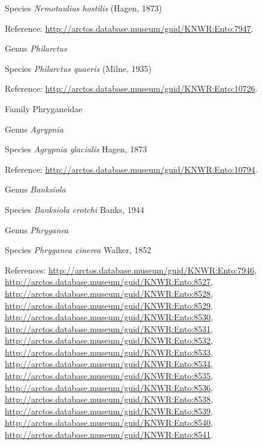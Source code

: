 \documentclass[9pt, article]{memoir}
\begin{document}
\begin{multicols}{2}
\vspace{6pt}\noindent\hspace{36pt}Species \textit{Nemotaulius hostilis} (Hagen, 1873)


Reference: 
\url{http://arctos.database.museum/guid/KNWR:Ento:7947}.

\vspace{6pt}\noindent\hspace{30pt}Genus \textit{Philarctus}


\vspace{6pt}\noindent\hspace{36pt}Species \textit{Philarctus quaeris} (Milne, 1935)


Reference: 
\url{http://arctos.database.museum/guid/KNWR:Ento:10726}.

\vspace{6pt}\noindent\hspace{24pt}Family Phryganeidae


\vspace{6pt}\noindent\hspace{30pt}Genus \textit{Agrypnia}


\vspace{6pt}\noindent\hspace{36pt}Species \textit{Agrypnia glacialis} Hagen, 1873


Reference: 
\url{http://arctos.database.museum/guid/KNWR:Ento:10794}.

\vspace{6pt}\noindent\hspace{30pt}Genus \textit{Banksiola}


\vspace{6pt}\noindent\hspace{36pt}Species \textit{Banksiola crotchi} Banks, 1944


\vspace{6pt}\noindent\hspace{30pt}Genus \textit{Phryganea}


\vspace{6pt}\noindent\hspace{36pt}Species \textit{Phryganea cinerea} Walker, 1852


References: 
\url{http://arctos.database.museum/guid/KNWR:Ento:7946}, 
\url{http://arctos.database.museum/guid/KNWR:Ento:8527}, 
\url{http://arctos.database.museum/guid/KNWR:Ento:8528}, 
\url{http://arctos.database.museum/guid/KNWR:Ento:8529}, 
\url{http://arctos.database.museum/guid/KNWR:Ento:8530}, 
\url{http://arctos.database.museum/guid/KNWR:Ento:8531}, 
\url{http://arctos.database.museum/guid/KNWR:Ento:8532}, 
\url{http://arctos.database.museum/guid/KNWR:Ento:8533}, 
\url{http://arctos.database.museum/guid/KNWR:Ento:8534}, 
\url{http://arctos.database.museum/guid/KNWR:Ento:8535}, 
\url{http://arctos.database.museum/guid/KNWR:Ento:8536}, 
\url{http://arctos.database.museum/guid/KNWR:Ento:8538}, 
\url{http://arctos.database.museum/guid/KNWR:Ento:8539}, 
\url{http://arctos.database.museum/guid/KNWR:Ento:8540}, 
\url{http://arctos.database.museum/guid/KNWR:Ento:8541}.


\end{multicols}
\end{document}
